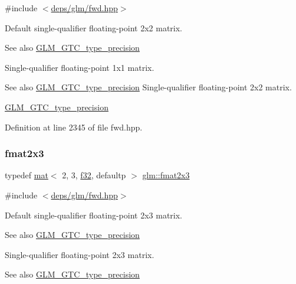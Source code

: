 {\ttfamily \#include $<$\hyperlink{fwd_8hpp}{deps/glm/fwd.\+hpp}$>$}

Default single-\/qualifier floating-\/point 2x2 matrix. \begin{DoxySeeAlso}{See also}
\hyperlink{group__gtc__type__precision}{G\+L\+M\+\_\+\+G\+T\+C\+\_\+type\+\_\+precision}
\end{DoxySeeAlso}
Single-\/qualifier floating-\/point 1x1 matrix. \begin{DoxySeeAlso}{See also}
\hyperlink{group__gtc__type__precision}{G\+L\+M\+\_\+\+G\+T\+C\+\_\+type\+\_\+precision} Single-\/qualifier floating-\/point 2x2 matrix. 

\hyperlink{group__gtc__type__precision}{G\+L\+M\+\_\+\+G\+T\+C\+\_\+type\+\_\+precision} 
\end{DoxySeeAlso}


Definition at line 2345 of file fwd.\+hpp.

\mbox{\label{group__gtc__type__precision_ga872da486765a299d84e9e8e6232ed306}} 
\subsubsection{\texorpdfstring{fmat2x3}{fmat2x3}}
{\footnotesize\ttfamily typedef \hyperlink{structglm_1_1mat}{mat}$<$ 2, 3, \hyperlink{group__gtc__type__precision_ga0ec999b57f5330d9021256e96038df04}{f32}, defaultp $>$ \hyperlink{group__gtc__type__precision_ga872da486765a299d84e9e8e6232ed306}{glm\+::fmat2x3}}



{\ttfamily \#include $<$\hyperlink{fwd_8hpp}{deps/glm/fwd.\+hpp}$>$}

Default single-\/qualifier floating-\/point 2x3 matrix. \begin{DoxySeeAlso}{See also}
\hyperlink{group__gtc__type__precision}{G\+L\+M\+\_\+\+G\+T\+C\+\_\+type\+\_\+precision}
\end{DoxySeeAlso}
Single-\/qualifier floating-\/point 2x3 matrix. \begin{DoxySeeAlso}{See also}
\hyperlink{group__gtc__type__precision}{G\+L\+M\+\_\+\+G\+T\+C\+\_\+type\+\_\+precision} 
\end{DoxySeeAlso}


